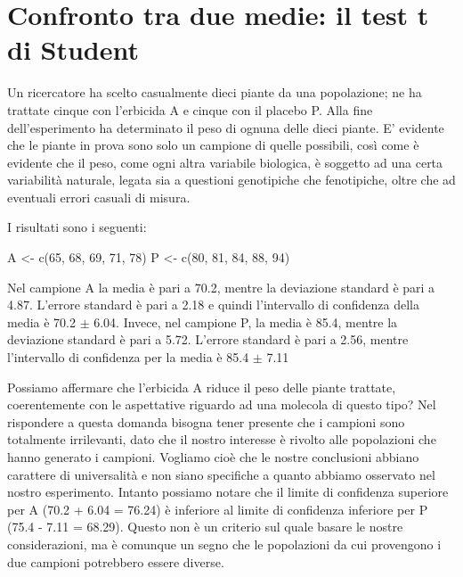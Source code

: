 \documentclass[a4paper,12pt,oneside]{book}
\newenvironment{Shaded}{}{}
\newcommand{\KeywordTok}[1]{#1}
\newcommand{\DecValTok}[1]{#1}
\newcommand{\StringTok}[1]{#1}
\newcommand{\NormalTok}[1]{#1}
\begin{document}
\hypertarget{confronto-tra-due-medie-il-test-t-di-student}{%
\section{Confronto tra due medie: il test t di Student}\label{confronto-tra-due-medie-il-test-t-di-student}}

Un ricercatore ha scelto casualmente dieci piante da una popolazione; ne ha trattate cinque con l'erbicida A e cinque con il placebo P. Alla fine dell'esperimento ha determinato il peso di ognuna delle dieci piante. E' evidente che le piante in prova sono solo un campione di quelle possibili, così come è evidente che il peso, come ogni altra variabile biologica, è soggetto ad una certa variabilità naturale, legata sia a questioni genotipiche che fenotipiche, oltre che ad eventuali errori casuali di misura.

I risultati sono i seguenti:

\begin{Shaded}
\begin{Highlighting}[]
\NormalTok{A <-}\StringTok{ }\KeywordTok{c}\NormalTok{(}\DecValTok{65}\NormalTok{, }\DecValTok{68}\NormalTok{, }\DecValTok{69}\NormalTok{, }\DecValTok{71}\NormalTok{, }\DecValTok{78}\NormalTok{)}
\NormalTok{P <-}\StringTok{ }\KeywordTok{c}\NormalTok{(}\DecValTok{80}\NormalTok{, }\DecValTok{81}\NormalTok{, }\DecValTok{84}\NormalTok{, }\DecValTok{88}\NormalTok{, }\DecValTok{94}\NormalTok{)}
\end{Highlighting}
\end{Shaded}

Nel campione A la media è pari a 70.2, mentre la deviazione standard è pari a 4.87. L'errore standard è pari a 2.18 e quindi l'intervallo di confidenza della media è 70.2 \(\pm\) 6.04. Invece, nel campione P, la media è 85.4, mentre la deviazione standard è pari a 5.72. L'errore standard è pari a 2.56, mentre l'intervallo di confidenza per la media è 85.4 \(\pm\) 7.11

Possiamo affermare che l'erbicida A riduce il peso delle piante trattate, coerentemente con le aspettative riguardo ad una molecola di questo tipo? Nel rispondere a questa domanda bisogna tener presente che i campioni sono totalmente irrilevanti, dato che il nostro interesse è rivolto alle popolazioni che hanno generato i campioni. Vogliamo cioè che le nostre conclusioni abbiano carattere di universalità e non siano specifiche a quanto abbiamo osservato nel nostro esperimento. Intanto possiamo notare che il limite di confidenza superiore per A (70.2 + 6.04 = 76.24) è inferiore al limite di confidenza inferiore per P (75.4 - 7.11 = 68.29). Questo non è un criterio sul quale basare le nostre considerazioni, ma è comunque un segno che le popolazioni da cui provengono i due campioni potrebbero essere diverse.
\end{document}
